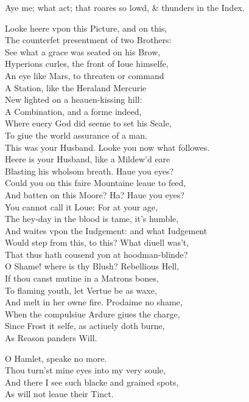 \documentclass[a5paper,DIV=calc,11pt]{scrbook}
\begin{document}
\begin{drama*}
    \queenspeaks Aye me; what act; that roares so lowd, \& thunders in the Index.
    
    \hamspeaks Looke heere vpon this Picture, and on this,\\
    The counterfet presentment of two Brothers:\\
    See what a grace was seated on his Brow,\\
    Hyperions curles, the front of Ioue himselfe,\\
    An eye like Mars, to threaten or command\\
    A Station, like the Heraland Mercurie\\
    New lighted on a heauen-kissing hill:\\
    A Combination, and a forme indeed,\\
    Where euery God did seeme to set his Seale,\\
    To giue the world assurance of a man.\\
    This was your Husband. Looke you now what followes.\\
    Heere is your Husband, like a Mildew'd eare\\
    Blasting his wholsom breath. Haue you eyes?\\
    Could you on this faire Mountaine leaue to feed,\\
    And batten on this Moore? Ha? Haue you eyes?\\
    You cannot call it Loue: For at your age,\\
    The hey-day in the blood is tame, it's humble,\\
    And waites vpon the Iudgement: and what Iudgement\\
    Would step from this, to this? What diuell was't,\\
    That thus hath cousend yon at hoodman-blinde?\\
    O Shame! where is thy Blush? Rebellious Hell,\\
    If thou canst mutine in a Matrons bones,\\
    To flaming youth, let Vertue be as waxe,\\
    And melt in her owne fire. Prodaime no shame,\\
    When the compulsiue Ardure giues the charge,\\
    Since Frost it selfe, as actiuely doth burne,\\
    As Reason panders Will.
    
    \queenspeaks O Hamlet, speake no more.\\
    Thou turn'st mine eyes into my very soule,\\
    And there I see such blacke and grained spots,\\
    As will not leaue their Tinct.
    

\end{drama*}
\end{document}
